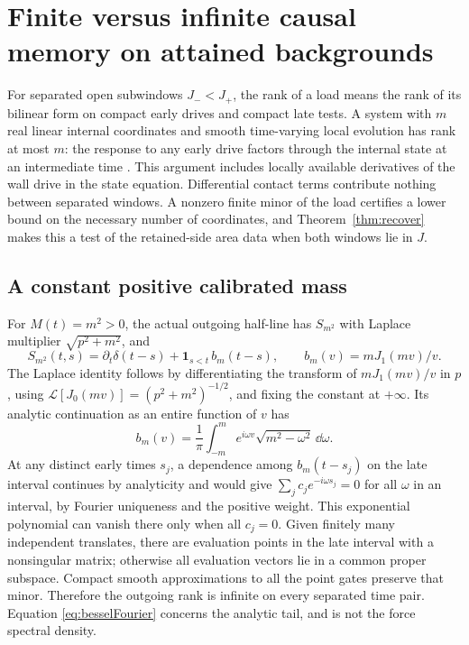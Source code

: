 \section{Finite versus infinite causal memory on attained backgrounds}
\label{sec:rank}
For separated open subwindows \(J_-<J_+\), the rank of a load means the rank of its bilinear form on compact early drives and compact late tests. A system with \(m\) real linear internal coordinates and smooth time-varying local evolution has rank at most \(m\): the response to any early drive factors through the internal state at an intermediate time \cite{TVrank}. This argument includes locally available derivatives of the wall drive in the state equation. Differential contact terms contribute nothing between separated windows. A nonzero finite minor of the load certifies a lower bound on the necessary number of coordinates, and Theorem~\ref{thm:recover} makes this a test of the retained-side area data when both windows lie in \(J\).

\subsection{A constant positive calibrated mass}
For \(M(t)=m^2>0\), the actual outgoing half-line has \(S_{m^2}\) with Laplace multiplier \(\sqrt{p^2+m^2}\), and
\[
 S_{m^2}(t,s)=\partial_t\delta(t-s)
       +{\boldsymbol1}_{s<t}\,b_m(t-s),
       \qquad b_m(v)=mJ_1(mv)/v .
\]
The Laplace identity follows by differentiating the transform of \(mJ_1(mv)/v\) in \(p\), using \(\mathcal L[J_0(mv)]=(p^2+m^2)^{-1/2}\), and fixing the constant at \(+\infty\). Its analytic continuation as an entire function of \(v\) has
\begin{equation}
            b_m(v)=\frac1\pi\int_{-m}^m e^{i\omega v}
                              \sqrt{m^2-\omega^2}\,\dd\omega .
 \label{eq:besselFourier}
\end{equation}
At any distinct early times \(s_j\), a dependence among \(b_m(t-s_j)\) on the late interval continues by analyticity and would give \(\sum_j c_j e^{-i\omega s_j}=0\) for all \(\omega\) in an interval, by Fourier uniqueness and the positive weight. This exponential polynomial can vanish there only when all \(c_j=0\). Given finitely many independent translates, there are evaluation points in the late interval with a nonsingular matrix; otherwise all evaluation vectors lie in a common proper subspace. Compact smooth approximations to all the point gates preserve that minor. Therefore the outgoing rank is infinite on every separated time pair. Equation \eqref{eq:besselFourier} concerns the analytic tail, and is not the force spectral density.

